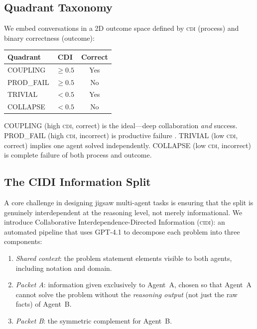 \documentclass{article}
\newcommand{\CDI}{\textsc{cdi}}
\newcommand{\CIDI}{\textsc{cidi}}
\begin{document}
\subsection{Quadrant Taxonomy}

We embed conversations in a 2D outcome space defined by \CDI{}
(process) and binary correctness (outcome):

\begin{center}
\begin{tabular}{lcc}
  \toprule
  \textbf{Quadrant} & \textbf{CDI} & \textbf{Correct} \\
  \midrule
  COUPLING  & $\geq 0.5$ & Yes \\
  PROD\_FAIL & $\geq 0.5$ & No  \\
  TRIVIAL    & $< 0.5$   & Yes \\
  COLLAPSE   & $< 0.5$   & No  \\
  \bottomrule
\end{tabular}
\end{center}

COUPLING (high \CDI, correct) is the ideal---deep collaboration \emph{and} success.
PROD\_FAIL (high \CDI, incorrect) is productive failure \citep{kapur2016examining}.
TRIVIAL (low \CDI, correct) implies one agent solved independently.
COLLAPSE (low \CDI, incorrect) is complete failure of both process and outcome.

\subsection{The CIDI Information Split}
\label{sec:cidi}

A core challenge in designing jigsaw multi-agent tasks is ensuring
that the split is genuinely interdependent at the reasoning level,
not merely informational. We introduce Collaborative
Interdependence-Directed Information (\CIDI): an automated pipeline
that uses GPT-4.1 to decompose each problem into three components:

\begin{enumerate}
  \item \emph{Shared context}: the problem statement elements visible
  to both agents, including notation and domain.
  \item \emph{Packet A}: information given exclusively to Agent~A,
  chosen so that Agent~A cannot solve the problem without the
  \emph{reasoning output} (not just the raw facts) of Agent~B.
  \item \emph{Packet B}: the symmetric complement for Agent~B.
\end{enumerate}
\end{document}
